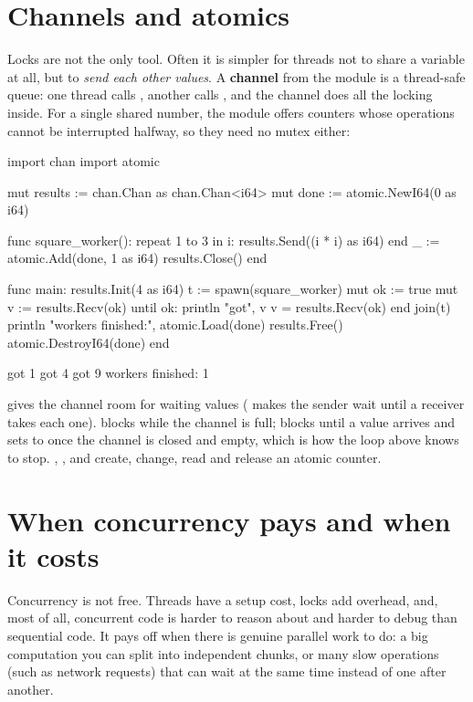 \section{Channels and atomics}

Locks are not the only tool. Often it is simpler for threads not to share a
variable at all, but to \emph{send each other values}. A \textbf{channel} from the
 module is a thread-safe queue: one thread calls , another
calls , and the channel does all the locking inside. For a single
shared number, the  module offers counters whose operations cannot be
interrupted halfway, so they need no mutex either:

\begin{salamen}
import chan
import atomic

mut results := chan.Chan {} as chan.Chan<i64>
mut done := atomic.NewI64(0 as i64)

func square_worker():
    repeat 1 to 3 in i:
        results.Send((i * i) as i64)
    end
    _ := atomic.Add(done, 1 as i64)
    results.Close()
end

func main:
    results.Init(4 as i64)
    t := spawn(square_worker)
    mut ok := true
    mut v := results.Recv(ok)
    until ok:
        println "got", v
        v = results.Recv(ok)
    end
    join(t)
    println "workers finished:", atomic.Load(done)
    results.Free()
    atomic.DestroyI64(done)
end
\end{salamen}

\begin{progout}
got 1
got 4
got 9
workers finished: 1
\end{progout}

 gives the channel room for  waiting values ( makes
the sender wait until a receiver takes each one).  blocks while the
channel is full;  blocks until a value arrives and sets 
to  once the channel is closed and empty, which is how the loop above
knows to stop. , ,  and
 create, change, read and release an atomic counter.

\section{When concurrency pays and when it costs}

Concurrency is not free. Threads have a setup cost, locks add overhead, and,
most of all, concurrent code is harder to reason about and harder to debug than
sequential code. It pays off when there is genuine parallel work to do: a big
computation you can split into independent chunks, or many slow operations (such
as network requests) that can wait at the same time instead of one after another.

